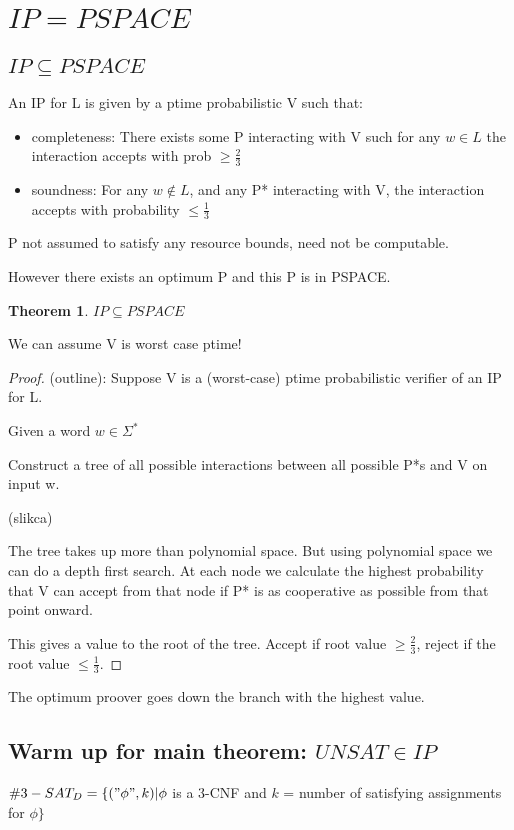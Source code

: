 \documentclass[a4paper,12pt]{article}
\theoremstyle{definition}
\newtheorem{theorem}[counter]{Theorem}
\theoremstyle{remark}
\begin{document}
\newpage
\section{$IP = PSPACE$}
\subsection{$IP \subseteq PSPACE$}
An IP for L is given by a ptime probabilistic V such that:
\begin{itemize}
    \item completeness: There exists some P interacting with V such for any $w \in L$ the interaction accepts with prob $\geq \frac{2}{3}$
    \item soundness: For any $w \notin L$, and any P* interacting with V, the interaction accepts with probability $\leq \frac{1}{3}$  
\end{itemize}

P not assumed to satisfy any resource bounds, need not be computable.

However there exists an optimum P and this P is in PSPACE.

\begin{theorem}
    $IP \subseteq PSPACE$
\end{theorem}

We can assume V is worst case ptime!

\begin{proof}
    (outline):
    Suppose V is a (worst-case) ptime probabilistic verifier of an IP for L.

    Given a word $w \in \Sigma^*$

    Construct a tree of all possible interactions between all possible P*s and V on input w.

    (slikca)

    The tree takes up more than polynomial space. But using polynomial space we can do a depth first search. At each node we calculate
    the highest probability that V can accept from that node if P* is as cooperative as possible from that point onward.

    This gives a value to the root of the tree. Accept if root value $\geq \frac{2}{3}$, reject if the root value $\leq \frac{1}{3}$.
\end{proof}

The optimum proover goes down the branch with the highest value.

\subsection*{Warm up for main theorem: $UNSAT \in IP$}
$\#3-SAT_D = \{("\phi", k) | \phi$ is a 3-CNF and $k$ = number of satisfying assignments for $\phi\}$
\end{document}
